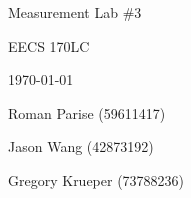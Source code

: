 \centering
\vspace*{5cm}
{\huge Measurement Lab \#3 \par}
{\Large EECS 170LC \par}
{\Large \today \par}
\vspace{1cm}
{\large Roman Parise (59611417) \par}
{\large Jason Wang (42873192) \par}
{\large Gregory Krueper (73788236) \par}
\vspace{1cm}
